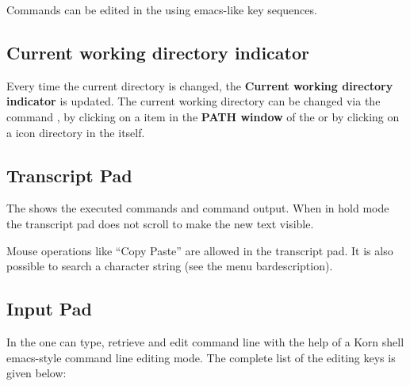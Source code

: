 Commands can be edited in the \IP{} using emacs-like key
sequences.


\subsection{Current working directory indicator}
Every time the current directory is changed, the {\bf Current working directory
indicator}  is updated. The current working directory can be changed via
the command , by clicking on a item in the {\bf PATH window} of the
\MB{} or by clicking on a icon directory in the \MB{} itself.

\subsection{Transcript Pad}
The \TP{}  shows the executed commands and command
output. When in hold mode  the transcript pad does not scroll to
make the new text visible.

Mouse operations like ``Copy Paste'' are allowed in the transcript pad.
It is also possible to search a character string (see the menu bardescription).

\subsection{Input Pad}
In the \IP{} one can type, retrieve and edit command line
with the help of a Korn shell emacs-style command line editing mode.
The complete list of the editing keys is given below:

